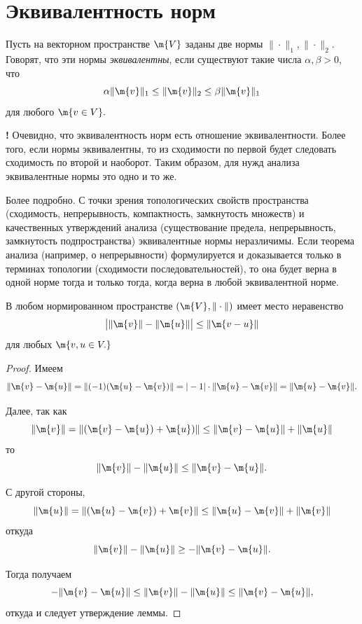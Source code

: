 \section{Эквивалентность норм}


\begin{definition}
Пусть на векторном пространстве $\m{V}$ заданы две нормы $\|\cdot\|_1, \|\cdot\|_2$. Говорят, что эти нормы \textit{эквивалентны}, если существуют такие числа $\alpha, \beta >0$, что
    \[
     \alpha \|\m{v}\|_1 \le \|\m{v}\|_2 \le \beta \|\m{v}\|_1
    \]
    для любого $\m{v\in V}.$
\end{definition}

\begin{mydangerr}{\bf !}
Очевидно, что эквивалентность норм есть отношение эквивалентности. Более того, если нормы эквивалентны, то из сходимости по первой будет следовать сходимость по второй и наоборот. Таким образом, для нужд анализа эквивалентные нормы это одно и то же.
\end{mydangerr}


\begin{remark}
    Более подробно. С точки зрения топологических свойств пространства (сходимость, непрерывность, компактность, замкнутость множеств) и качественных утверждений анализа (существование предела, непрерывность, замкнутость подпространства) эквивалентные нормы неразличимы. Если теорема анализа (например, о непрерывности) формулируется и доказывается только в терминах топологии (сходимости последовательностей), то она будет верна в одной норме тогда и только тогда, когда верна в любой эквивалентной норме.
\end{remark}

\begin{lemma}\label{x-y<|x-y|} В любом нормированном пространстве $(\m{V}, \|\cdot\|)$ имеет место неравенство
  \[
     \bigl| \| \m{v} \| - \|\m{u} \|  \bigr| \le \|\m{v-u} \|
    \]
для любых $\m{v,u \in V.}$
\end{lemma}

\begin{proof} Имеем 
$$\|\m{v}-\m{u}\| = \| (-1)(\m{u}-\m{v})\| = |-1| \cdot \|\m{u}-\m{v}\| = \|\m{u}-\m{v}\|.$$

Далее, так как
    \[
     \|\m{v}\| = \|(\m{v}-\m{u})+\m{u}) \| \le \|\m{v}-\m{u}\| + \|\m{u}\| 
     \]
то $$\|\m{v}\| - \|\m{u}\| \le \|\m{v}-\m{u}\|.$$

С другой стороны, 
    \[
     \|\m{u}\| = \|(\m{u}-\m{v}) +\m{v}\| \le \|\m{u}-\m{v}\| + \|\m{v}\|
    \]
откуда
\[
 \|\m{v}\| - \|\m{u}\| \ge - \|\m{v}-\m{u}\|.
\]

Тогда получаем
    \[
    - \|\m{v}-\m{u}\| \le \|\m{v}\| - \|\m{u}\| \le \|\m{v}-\m{u}\|,
    \]
откуда и следует утверждение леммы.
 \end{proof}


